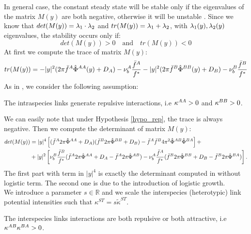 In general case, the constant steady state will be stable only if the eigenvalues of the matrix $M(y)$ are both negative, otherwise it will be unstable . Since we know that $det(M(y))={\lambda}_1 \cdot {\lambda}_2$ and $tr(M(y))={\lambda}_1+{\lambda}_2$, with ${\lambda}_1(y), {\lambda}_2(y)$ eigenvalues, the stability occurs only if:
\[det(M(y))>0\quad \text{and} \quad tr(M(y))<0\]
At first we compute the trace of matrix $M(y)$:
\begin{equation}
 tr(M(y))=-|y|^2(2\pi{\bar{f}^A}{\hat{\Phi}^{AA}}(y)+D_A)-\nu_{b}^A\frac{{\bar{f}^A}}{f^*}-|y|^2(2\pi{\bar{f}^B}{\hat{\Phi}^{BB}}(y)+D_B)-\nu_{b}^B\frac{{\bar{f}^B}}{f^*}
\end{equation}
As in \cite{twoparticule}, we consider the following assumption:
\begin{hypo}\label{hypo_rep}
 The intraspecies links generate repulsive interactions, i.e ${\kappa^{AA}}>0$ and ${\kappa^{BB}}>0$.
\end{hypo}
We can easily note that under Hypothesis \ref{hypo_rep}, the trace is always negative.
Then we compute the determinant of matrix $M(y)$:
\begin{equation}
\begin{split}
det(M(y))&= |y|^4 \left[ ({\bar{f}^A} 2\pi {\hat{\Phi}^{AA}} +D_A)({\bar{f}^B} 2\pi {\hat{\Phi}^{BB}} +D_B) - {\bar{f}^A} {\bar{f}^B} 4 \pi^2 {\hat{\Phi}^{AB}} {\hat{\Phi}^{BA}} \right] + \\
&+|y|^2 \left[ \nu_b^B \frac{{\bar{f}^B}}{f^{*}}({\bar{f}^A} 2\pi {\hat{\Phi}^{AA}} + D_A -{\bar{f}^A} 2\pi {\hat{\Phi}^{AB}}) - \nu_b^A \frac{{\bar{f}^A}}{f^{*}}({\bar{f}^B} 2\pi {\hat{\Phi}^{BB}} + D_B -{\bar{f}^B} 2\pi {\hat{\Phi}^{BA}})   \right].
\end{split}
\end{equation}
The first part with term in $|y|^4$ is exactly the determinant computed in \cite{twoparticule} without logistic term. The second one is due to the introduction of logistic growth. \\
 We introduce a parameter $s \in \mathbb{R}$ and we scale the interspecies (heterotypic) link potential intensities such that $\kappa^{ST}=s \widetilde{\kappa}^{ST} $. 
\begin{hypo}\label{hypo_rep2}
 The interspecies links interactions are both repulsive or both attractive, i.e ${\kappa^{AB}}{\kappa^{BA}}>0$. 
\end{hypo}
